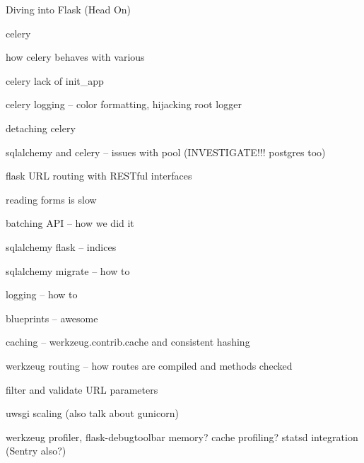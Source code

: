 Diving into Flask (Head On)


celery

how celery behaves with various

celery lack of init_app

celery logging -- color formatting, hijacking root logger

detaching celery

sqlalchemy and celery -- issues with pool (INVESTIGATE!!! postgres too)

flask URL routing with RESTful interfaces

reading forms is slow

batching API -- how we did it

sqlalchemy flask -- indices

sqlalchemy migrate -- how to

logging -- how to

blueprints -- awesome

caching -- werkzeug.contrib.cache and consistent hashing


werkzeug routing -- how routes are compiled and methods checked

filter and validate URL parameters

uwsgi scaling (also talk about gunicorn)

werkzeug profiler, flask-debugtoolbar
memory?
cache profiling?
statsd integration
(Sentry also?)
